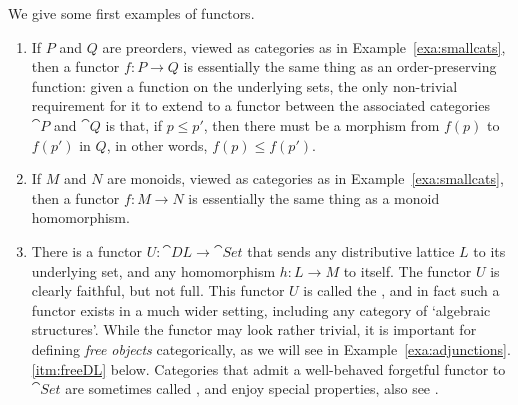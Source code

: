 \begin{example}\label{exa:cov-functor-examples} We give some first examples of functors.
  \begin{enumerate}
    \item If $P$ and $Q$ are preorders, viewed as categories as in Example~\ref{exa:smallcats}, then a functor $f \colon P \to Q$ is essentially the same thing as an order-preserving function: given a function on the underlying sets, the only non-trivial requirement for it to extend to a functor between the associated categories $\cat{P}$ and $\cat{Q}$ is that, if $p \leq p'$, then there must be a morphism from $f(p)$ to $f(p')$ in $Q$, in other words, $f(p) \leq f(p')$.
      \item If $M$ and $N$ are monoids, viewed as categories as in Example~\ref{exa:smallcats}, then a functor $f \colon M \to N$ is essentially the same thing as a monoid homomorphism.
        \item \label{itm:forgetfulfunctor} There is a functor $U \colon \cat{DL} \to \cat{Set}$ that sends any distributive lattice $L$ to its underlying set, and any homomorphism $h \colon L \to M$ to itself. The functor $U$ is clearly faithful, but not full. This functor $U$ is called the , and in fact such a functor exists in a much wider setting, including any category of `algebraic structures'. While the functor may look rather trivial, it is important for defining \emph{free objects} categorically, as we will see in Example~\ref{exa:adjunctions}.\ref{itm:freeDL} below. Categories that admit a well-behaved forgetful functor to $\cat{Set}$ are sometimes called , and enjoy special properties, also see \cite{AdaHerStr1990}.
\end{enumerate}
\end{example}

